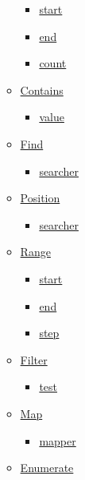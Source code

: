 \begin{itemize}
\begin{itemize}
    \begin{itemize}
    \tightlist
    \item
      \hyperref[definitions-slice-start]{start}
    \item
      \hyperref[definitions-slice-end]{end}
    \item
      \hyperref[definitions-slice-count]{count}
    \end{itemize}
  \item
    \hyperref[definitions-contains]{Contains}

    \begin{itemize}
    \tightlist
    \item
      \hyperref[definitions-contains-value]{value}
    \end{itemize}
  \item
    \hyperref[definitions-find]{Find}

    \begin{itemize}
    \tightlist
    \item
      \hyperref[definitions-find-searcher]{searcher}
    \end{itemize}
  \item
    \hyperref[definitions-position]{Position}

    \begin{itemize}
    \tightlist
    \item
      \hyperref[definitions-position-searcher]{searcher}
    \end{itemize}
  \item
    \hyperref[definitions-range]{Range}

    \begin{itemize}
    \tightlist
    \item
      \hyperref[definitions-range-start]{start}
    \item
      \hyperref[definitions-range-end]{end}
    \item
      \hyperref[definitions-range-step]{step}
    \end{itemize}
  \item
    \hyperref[definitions-filter]{Filter}

    \begin{itemize}
    \tightlist
    \item
      \hyperref[definitions-filter-test]{test}
    \end{itemize}
  \item
    \hyperref[definitions-map]{Map}

    \begin{itemize}
    \tightlist
    \item
      \hyperref[definitions-map-mapper]{mapper}
    \end{itemize}
  \item
    \hyperref[definitions-enumerate]{Enumerate}


\end{itemize}
\end{itemize}
